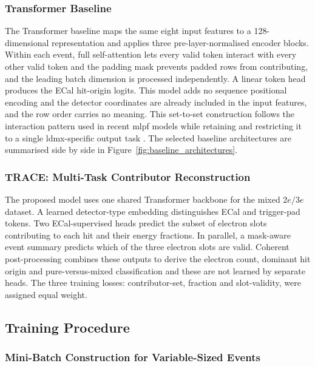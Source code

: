 \subsubsection{Transformer Baseline}

The Transformer baseline maps the same eight input features to a
128-dimensional representation and applies three pre-layer-normalised
encoder blocks. Within each event, full self-attention lets every valid token
interact with every other valid token and the padding mask prevents padded rows
from contributing, and the leading batch dimension is processed
independently. A linear token head produces the ECal hit-origin logits. This
model adds no sequence positional encoding and the detector coordinates are already
included in the input features, and the row order carries no meaning. This
set-to-set construction follows the interaction pattern used in recent
\gls{mlpf} models while retaining and restricting it to a single \gls{ldmx}-specific output task
\cite{pata2026-mlpf}. The selected baseline architectures are summarised side by side in
Figure~\ref{fig:baseline_architectures}.




\subsubsection{TRACE: Multi-Task Contributor Reconstruction}

The proposed model uses one shared Transformer backbone for the mixed
\(2e/3e\) dataset. A learned detector-type embedding distinguishes ECal and
trigger-pad tokens. Two ECal-supervised heads predict the subset of electron
slots contributing to each hit and their energy fractions. In parallel, a
mask-aware event summary predicts which of the three electron slots are
valid. Coherent post-processing combines these outputs to derive the electron
count, dominant hit origin and pure-versus-mixed classification and these are
not learned by separate heads. The three training losses: contributor-set,
fraction and slot-validity, were assigned equal weight.



\subsection{Training Procedure}



\subsubsection{Mini-Batch Construction for Variable-Sized Events}
\label{sec:method_batching}


